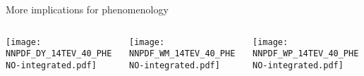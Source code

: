 \begin{frame}{More implications for phenomenology}
    \begin{columns}
        \begin{column}[T]{0.32\textwidth}
            \centering
            \texttt{[image: NNPDF\_DY\_14TEV\_40\_PHENO-integrated.pdf]}
        \end{column}
        \begin{column}[T]{0.32\textwidth}
            \centering
            \texttt{[image: NNPDF\_WM\_14TEV\_40\_PHENO-integrated.pdf]}\\
        \end{column}
        \begin{column}[T]{0.32\textwidth}
            \centering
            \texttt{[image: NNPDF\_WP\_14TEV\_40\_PHENO-integrated.pdf]}
        \end{column}
    \end{columns}
\end{frame}

